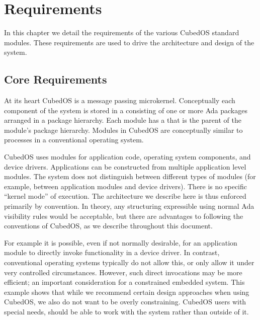 
\chapter{Requirements}
\label{chapt:requirements}

In this chapter we detail the requirements of the various CubedOS standard modules. These
requirements are used to drive the architecture and design of the system. 

\section{Core Requirements}
\label{sec:core-requirements}

At its heart CubedOS is a message passing microkernel. Conceptually each component of the system
is stored in a  consisting of one or more Ada packages arranged in a package
hierarchy. Each module has a  that is the parent of the module's
package hierarchy. Modules in CubedOS are conceptually similar to processes in a conventional
operating system.

CubedOS uses modules for application code, operating system components, and device drivers.
Applications can be constructed from multiple application level modules. The system does not
distinguish between different types of modules (for example, between application modules and
device drivers). There is no specific ``kernel mode'' of execution. The architecture we describe
here is thus enforced primarily by convention. In theory, any structuring expressible using
normal Ada visibility rules would be acceptable, but there are advantages to following the
conventions of CubedOS, as we describe throughout this document.

For example it is possible, even if not normally desirable, for an application module to
directly invoke functionality in a device driver. In contrast, conventional operating systems
typically do not allow this, or only allow it under very controlled circumstances. However, such
direct invocations may be more efficient; an important consideration for a constrained embedded
system. This example shows that while we recommend certain design approaches when using CubedOS,
we also do not want to be overly constraining. CubedOS users with special needs, should be able
to work with the system rather than outside of it.

